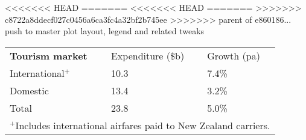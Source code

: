 <<<<<<< HEAD
=======
<<<<<<< HEAD
=======
>>>>>>> c8722a8ddecf027c0456a6ca3fc4a32bf2b745ee
>>>>>>> parent of e860186... push to master plot layout, legend and related tweaks
\begin{tabular}[t]{p{4.2cm}>{\hfill}p{1.9cm}>{\hfill}p{1.4cm}}
 \textbf{Tourism market} & Expenditure (\$b) & Growth (pa) \\ 
 International$^+$ & 10.3 & 7.4\% \\ 
  Domestic & 13.4 & 3.2\% \\ 
  Total & 23.8 & 5.0\% \\ 
  \multicolumn{3}{p{7.5cm}}{$^+$Includes international airfares paid to New Zealand carriers.}\ 
\end{tabular}
